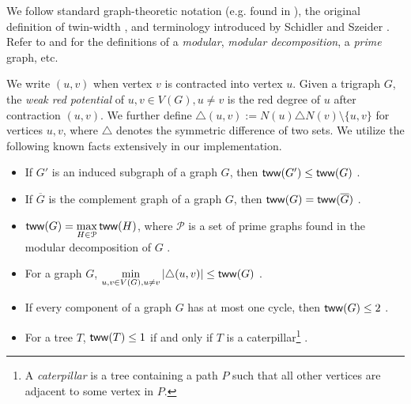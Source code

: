 \documentclass[a4paper,UKenglish,cleveref, autoref, thm-restate]{lipics-v2021}
\begin{document}
We follow standard graph-theoretic notation (e.g. found in \cite{diestel2017graph}),
the original definition of twin-width \cite{bonnet_twin-width_2020,bonnet_twin-width_2021,
bonnet_twin-width_2021-1},
and terminology introduced by Schidler and Szeider \cite{schidler_sat_2021}.
%
Refer to \cite{habib_survey_2010} and \cite{tedder_simple_2008} for the definitions of
a \emph{modular}, \emph{modular decomposition}, a \emph{prime} graph, etc.

We write $(u,v)$ when vertex $v$ is contracted into vertex $u$.
Given a trigraph $G$, the \emph{weak red potential} of $u,v \in V(G), u \neq v$
is the red degree of $u$ after contraction $(u,v)$.
%
We further define
$\triangle(u,v) := N(u) \triangle N(v) \setminus \{u,v\}$ for vertices $u,v$,
where $\triangle$ denotes the symmetric difference of two sets.
%
%
%
%
%
%
We utilize the following known facts extensively in our implementation.
\begin{itemize}
    \item If $G'$ is an induced subgraph of a graph $G$, then $\textnormal{\textsf{tww}}(G') \leq \textnormal{\textsf{tww}}(G)$ \cite{bonnet_twin-width_2020}.
    \item If $\overline{G}$ is the complement graph of a graph $G$, then $\textnormal{\textsf{tww}}(G) = \textnormal{\textsf{tww}}(\overline{G})$ \cite{bonnet_twin-width_2020}.
    \item $\displaystyle \textnormal{\textsf{tww}}(G) = \max_{H \in \mathcal{P}} \textnormal{\textsf{tww}}(H)$,
    where $\mathcal{P}$ is a set of prime graphs found in the modular decomposition of $G$ \cite{schidler_sat_2021}.
    \item For a graph $G$, $\displaystyle \min_{u,v\in V(G), u \neq v}|\triangle(u,v)| \leq \textnormal{\textsf{tww}}(G)$ \cite{schidler_sat_2021}.
    \item If every component of a graph $G$ has at most one cycle, then $\textnormal{\textsf{tww}}(G) \leq 2$ \cite{ahn_bounds_2022}.
    \item For a tree $T$, $\textnormal{\textsf{tww}}(T) \leq 1$ if and only if $T$ is a caterpillar\footnote{%
    A \emph{caterpillar} is a tree containing a path $P$ such that all other vertices are
    adjacent to some vertex in $P$.
    } \cite{ahn_bounds_2022}.
\end{itemize}
\end{document}
